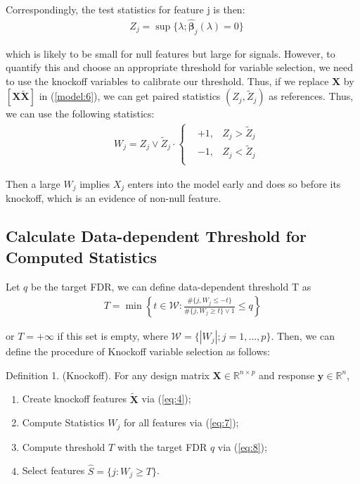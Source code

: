 \documentclass{uwstat572}
\begin{document}
Correspondingly, the test statistics for feature j is then:
\begin{align}
& Z_j = \sup\{\lambda; \hat{\bm{\beta}}_j(\lambda)=0 \}
\end{align}

which is likely to be small for null features but large for signals.
However, to quantify this and choose an appropriate threshold for variable selection, we need to use the knockoff variables to calibrate our threshold. Thus, if we replace $\bm{X}$ by $[\bm{X} \bm{\tilde{X}}]$ in (\ref{model:6}), we can get paired statistics $(Z_j, \tilde{Z}_j)$ as references. Thus, we can use the following statistics:
\begin{align}\label{eq:7}
&{W}_j = Z_j\vee \tilde{Z}_j \cdot \left\{\begin{aligned}
& +1, & 	Z_j > \tilde{Z}_j\\ & -1, & 	Z_j < \tilde{Z}_j\\ 
\end{aligned} \right.
\end{align}

Then a large $W_j$ implies $X_j$ enters into the model early and does so before its knockoff, which is an evidence of non-null feature.

\subsection{Calculate Data-dependent Threshold for Computed Statistics}
Let $q$ be the target FDR, we can define data-dependent threshold T as 
\begin{align}\label{eq:8}
T  = \min\left\{t\in\mathcal{W}: \frac{\#\{j, W_j\leq -t\}}{\#\{j, W_j\geq t\}\vee 1}\leq q \right\}
\end{align}

or $T=+\infty$ if this set is empty, where $\mathcal{W} = \{|W_j|;j=1,\dots,p \}$. Then, we can define the procedure of Knockoff variable selection as follows:

{\sc Definition 1. }(Knockoff). For any design matrix $\bm{X}\in\mathbb{R}^{n\times p}$ and response $\bm{y}\in \mathbb{R}^n$, 
\begin{enumerate}
	\item Create knockoff features $\bm{\tilde X}$ via (\ref{eq:4});
	\item Compute Statistics $W_j$ for all features via (\ref{eq:7});
	\item Compute threshold $T$ with the target FDR $q$ via (\ref{eq:8});
	\item Select features $\hat{S} =\{j: W_j\geq T\}$.
\end{enumerate}
\end{document}
